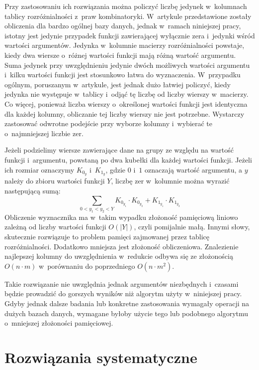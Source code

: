 Przy zastosowaniu ich rozwiązania można policzyć liczbę jedynek w~kolumnach tablicy rozróżnialności z~praw kombinatoryki.
W~artykule przedstawione zostały obliczenia dla bardzo ogólnej bazy danych,
jednak w~ramach niniejszej pracy,
istotny jest jedynie przypadek funkcji zawierającej wyłącznie zera i~jedynki wśród wartości argumentów.
Jedynka w~kolumnie macierzy rozróżnialności powstaje,
kiedy dwa wiersze o~różnej wartości funkcji mają różną wartość argumentu.
Suma jedynek przy uwzględnieniu jedynie dwóch możliwych wartości argumentu i~kilku wartości funkcji jest stosunkowo łatwa do wyznaczenia.
W~przypadku ogólnym,
poruszanym w~artykule,
jest jednak dużo łatwiej policzyć,
kiedy jedynka nie występuje w~tablicy i~odjąć tę liczbę od liczby wierszy w~macierzy.
Co więcej,
ponieważ liczba wierszy o~określonej wartości funkcji jest identyczna dla każdej kolumny,
obliczanie tej liczby wierszy nie jest potrzebne.
Wystarczy zastosować odwrotne podejście przy wyborze kolumny i~wybierać te o~najmniejszej liczbie zer.

Jeżeli podzielimy wiersze zawierające dane na grupy ze względu na wartość funkcji i~argumentu,
powstaną po dwa kubełki dla każdej wartości funkcji.
Jeżeli ich rozmiar oznaczymy $K_{0_y}$ i~$K_{1_y}$,
 gdzie $0$ i~$1$ oznaczają wartość argumentu,
a $y$ należy do zbioru wartości funkcji $Y$,
liczbę zer w~kolumnie można wyrazić następującą sumą:
\begin{equation}
\sum_{0<y_1<y_2<Y} K_{0_{y_1}} \cdot K_{0_{y_2}} + K_{1_{y_1}} \cdot K_{1_{y_2}}
\end{equation}
Obliczenie wyznacznika ma w~takim wypadku złożoność pamięciową liniowo zależną od liczby wartości funkcji $O(\left\vert{Y}\right\vert)$,
czyli pomijalnie małą.
Innymi słowy, skutecznie rozwiązuje to problem pamięci zajmowanej przez tablicę rozróżnialności.
Dodatkowo mniejsza jest złożoność obliczeniowa.
Znalezienie najlepszej kolumny do uwzględnienia w~redukcie odbywa się ze złożonością $O(n \cdot m)$ w~porównaniu do poprzedniego $O(n \cdot m^2)$.

Takie rozwiązanie nie uwzględnia jednak argumentów niezbędnych i~czasami będzie prowadzić do gorszych wyników niż algorytm użyty w~niniejszej pracy.
Gdyby jednak dalsze badania lub konkretne zastosowania wymagały operacji na dużych bazach danych,
wymagane byłoby użycie tego lub podobnego algorytmu o~mniejszej złożoności pamięciowej.

\section{Rozwiązania systematyczne}


